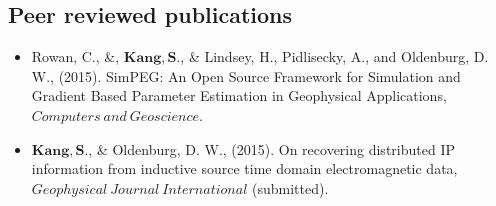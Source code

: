 \documentclass[letterpaper,11pt]{article}
\begin{document}
\subsection{Peer reviewed publications}
\begin{itemize}
\item
Rowan, C., \&, $\mathbf{Kang, S.}$, \& Lindsey, H., Pidlisecky, A., and Oldenburg, D. W., (2015). SimPEG: An Open Source Framework for Simulation and Gradient Based Parameter Estimation in Geophysical Applications, $\mathit Computers \ and \ Geoscience$.
\item 
$\mathbf{Kang, S.}$, \& Oldenburg, D. W., (2015). On recovering distributed IP information from inductive source time domain electromagnetic data,  $\mathit Geophysical \ Journal \ International$ (submitted).
\end{itemize}
\newpage

% 

\end{document}
